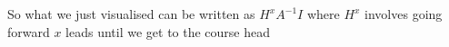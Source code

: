 \documentclass[preview]{standalone}
\begin{document}
\begin{flushleft}
So what we just visualised can be written as $H^xA^{-1}I$ where $H^x$ involves going forward $x$ leads until we get to the course head
\end{flushleft}
\end{document}
